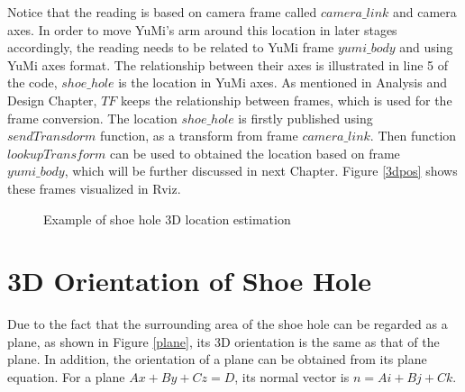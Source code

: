 Notice that the reading is based on camera frame called $camera\_link$ and camera axes. In order to move YuMi's arm around this location in later stages accordingly, the reading needs to be related to YuMi frame $yumi\_body$ and using YuMi axes format. The relationship between their axes is illustrated in line 5 of the code, $shoe\_hole$ is the location in YuMi axes. As mentioned in Analysis and Design Chapter, $TF$ keeps the relationship between frames, which is used for the frame conversion. The location $shoe\_hole$ is firstly published using $sendTransdorm$ function, as a transform from frame $camera\_link$. Then function $lookupTransform$ can be used to obtained the location based on frame $yumi\_body$, which will be further discussed in next Chapter. Figure \ref{3dpos} shows these frames visualized in Rviz.

\begin{figure}[H]
\centering
{}
\caption{Example of shoe hole 3D location estimation}
\end{figure}

\section{3D Orientation of Shoe Hole}
Due to the fact that the surrounding area of the shoe hole can be regarded as a plane, as shown in Figure \ref{plane}, its 3D orientation is the same as that of the plane. In addition, the orientation of a plane can be obtained from its plane equation. For a plane $Ax + By + Cz = D$, its normal vector is $n = Ai + Bj + Ck$.

